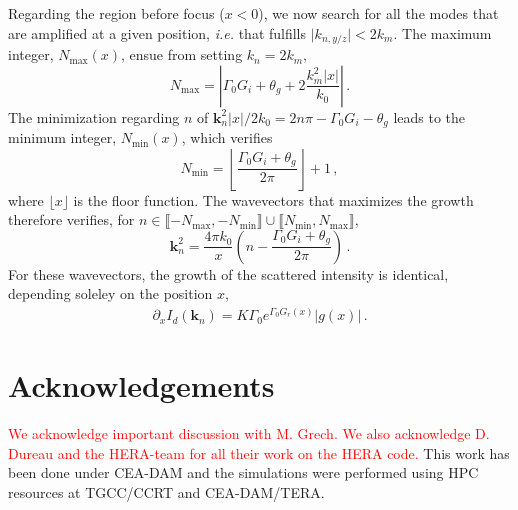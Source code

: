 \documentclass[
 reprint,
 amsmath,amssymb,
 aps,
]{revtex4-1}
\begin{document}
Regarding the region before focus ($x<0$), we now search for all the  modes that are amplified at a given position, \emph{i.e.} that fulfills $\vert k_{n,y/z}\vert <2k_m$. 
The maximum integer, $N_\mathrm{max}(x)$, ensue from setting  $k_n=2k_m$,
\begin{equation}\label{eq:nx}
    N_\mathrm{max} = \left\vert  \Gamma_0 G_i +\theta_g+2\frac{k_m^2 \vert x \vert  }{k_0}  \right\vert \, . 
\end{equation}
The minimization regarding $n$ of  $\mathbf{k}_n^2 \vert x\vert  /2k_0 = 2n\pi-\Gamma_0 G_i- \theta_g$ leads to  the minimum integer, $N_\mathrm{min}(x)$, which verifies
\begin{equation}\label{eq:nx}
    N_\mathrm{min} =  \left\lfloor\frac{\Gamma_0 G_i+ \theta_g}{2\pi}\right\rfloor+1\, ,
\end{equation}
where $\lfloor x  \rfloor$ is the floor function.
The wavevectors that maximizes the growth therefore verifies,
for $n\in  \llbracket -N_\mathrm{max} ,-N_\mathrm{min} \rrbracket   \cup \llbracket N_\mathrm{min} ,N_\mathrm{max} \rrbracket$, 
\begin{equation}\label{eq:nx}
    \mathbf{k}_n^2 =\frac{4\pi k_0}{x} \left(n- \frac{\Gamma_0 G_i +\theta_g}{2\pi}   \right) \, .
\end{equation}
For these wavevectors, the growth of the scattered intensity is identical, depending soleley on the position $x$, 
\begin{align}
\partial_x I_d(\mathbf{k}_n) = K\Gamma_0   e^{\Gamma_0 G_r(x)} \vert g(x) \vert \, . \label{eq:dxidkn}
\end{align} 





\section*{Acknowledgements}
 \textcolor{red}{We acknowledge important discussion with M. Grech.  
 We also acknowledge D. Dureau and the HERA-team for all their work on the HERA code. }
This work has been done under   CEA-DAM and
the simulations were performed using HPC resources at TGCC/CCRT and CEA-DAM/TERA.

\end{document}

